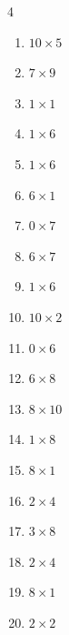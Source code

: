 \begin{multicols}{4}
\begin{enumerate}
  \item $10\times 5$
        \phantom{$=50$}

  \item $7\times 9$
        \phantom{$=63$}

  \item $1\times 1$
        \phantom{$=1$}

  \item $1\times 6$
        \phantom{$=6$}

  \item $1\times 6$
        \phantom{$=6$}

  \item $6\times 1$
        \phantom{$=6$}

  \item $0\times 7$
        \phantom{$=0$}

  \item $6\times 7$
        \phantom{$=42$}

  \item $1\times 6$
        \phantom{$=6$}

  \item $10\times 2$
        \phantom{$=20$}

  \item $0\times 6$
        \phantom{$=0$}

  \item $6\times 8$
        \phantom{$=48$}

\columnbreak %

\resetques

  \item $8\times 10$
        \phantom{$=80$}

  \item $1\times 8$
        \phantom{$=8$}

  \item $8\times 1$
        \phantom{$=8$}

  \item $2\times 4$
        \phantom{$=8$}

  \item $3\times 8$
        \phantom{$=24$}

  \item $2\times 4$
        \phantom{$=8$}

  \item $8\times 1$
        \phantom{$=8$}

  \item $2\times 2$
        \phantom{$=4$}


\end{enumerate}
\end{multicols}
